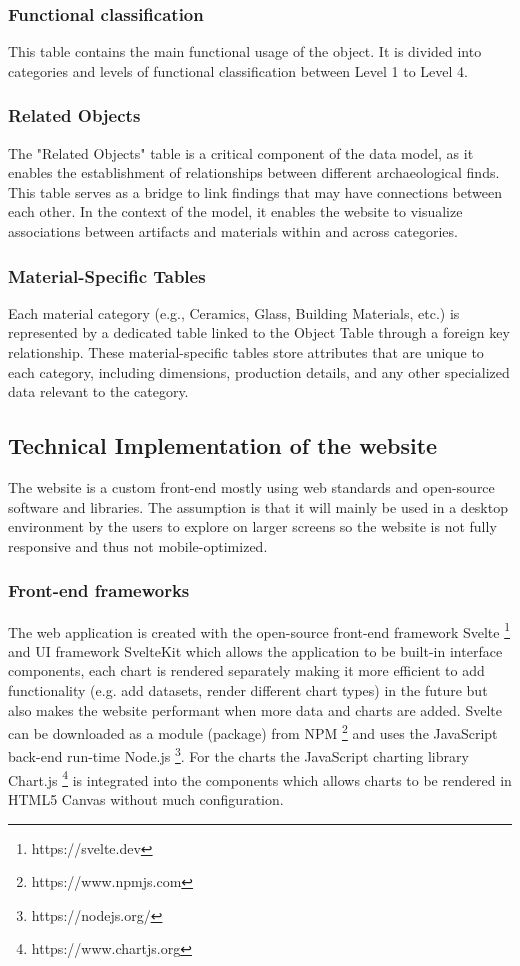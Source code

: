 \subsubsection{Functional classification}
This table contains the main functional usage of the object. It is divided into categories and levels of functional classification between Level 1 to Level 4.

\subsubsection{Related Objects}
The "Related Objects" table is a critical component of the data model, as it enables the establishment of relationships between different archaeological finds. This table serves as a bridge to link findings that may have connections between each other. In the context of the model, it enables the website to visualize associations between artifacts and materials within and across categories.

\subsubsection{Material-Specific Tables}
Each material category (e.g., Ceramics, Glass, Building Materials, etc.) is represented by a dedicated table linked to the Object Table through a foreign key relationship. These material-specific tables store attributes that are unique to each category, including dimensions, production details, and any other specialized data relevant to the category.

\subsection{Technical Implementation of the website}

The website is a custom front-end mostly using web standards and open-source software and libraries. The assumption is that it will mainly be used in a desktop environment by the users to explore on larger screens so the website is not fully responsive and thus not mobile-optimized. 

\subsubsection{Front-end frameworks}
The web application is created with the open-source front-end framework Svelte \footnote{https://svelte.dev} and UI framework SvelteKit which allows the application to be built-in interface components, each chart is rendered separately making it more efficient to add functionality (e.g. add datasets, render different chart types) in the future but also makes the website performant when more data and charts are added. Svelte can be downloaded as a module (package) from NPM \footnote{https://www.npmjs.com} and uses the JavaScript back-end run-time Node.js \footnote{https://nodejs.org/}. For the charts the JavaScript charting library Chart.js \footnote{https://www.chartjs.org} is integrated into the components which allows charts to be rendered in HTML5 Canvas without much configuration. 

